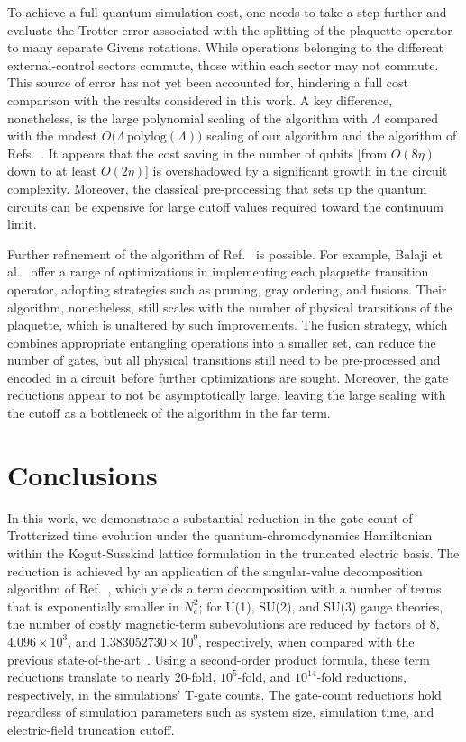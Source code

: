 \documentclass[aps,prd,twocolumn,showpacs,groupedaddress,superscriptaddress,nofootinbib,floatfix,preprintnumbers,longbibliography]{revtex4-1}
\begin{document}
To achieve a full quantum-simulation cost, one needs to take a step further and evaluate the Trotter error associated with the splitting of the plaquette operator to many separate Givens rotations. 
While operations belonging to the different external-control sectors commute, those within each sector may not commute. This source of error has not yet been accounted for, hindering a full cost comparison with the results considered in this work. A key difference, nonetheless, is the large polynomial scaling of the algorithm with $\Lambda$ compared with the modest ${O}\big(\Lambda\,\text{polylog}(\Lambda)\big)$ scaling of our algorithm and the algorithm of Refs.~\cite{Kan:2021xfc,Rhodes:2024zbr}. It appears that the cost saving in the number of qubits [from $O(8\eta)$ down to at least $O(2\eta)$] is overshadowed by a significant growth in the circuit complexity. Moreover, the classical pre-processing that sets up the quantum circuits can be expensive for large cutoff values required toward the continuum limit.

Further refinement of the algorithm of Ref.~\cite{Ciavarella:2021nmj} is possible. For example, Balaji et al.~\cite{Balaji:2025afl} offer a range of optimizations in implementing each plaquette transition operator, adopting strategies such as pruning, gray ordering, and fusions. Their algorithm, nonetheless, still scales with the number of physical transitions of the plaquette, which is unaltered by such improvements. The fusion strategy, which combines appropriate entangling operations into a smaller set, can reduce the number of gates, but all physical transitions still need to be pre-processed and encoded in a circuit before further optimizations are sought. Moreover, the gate reductions appear to not be asymptotically large, leaving the large scaling with the cutoff as a bottleneck of the algorithm in the far term.



\section{Conclusions
\label{sec:outlook}
}
\noindent
In this work, we demonstrate a substantial reduction in the gate count of Trotterized time evolution under the quantum-chromodynamics Hamiltonian within the Kogut-Susskind lattice formulation in the truncated electric basis. The reduction is achieved by an application of the singular-value decomposition algorithm of Ref.~\cite{Davoudi:2022xmb}, which yields a term decomposition with a number of terms that is exponentially smaller in $N_c^2$;
for U(1), SU(2), and SU(3) gauge theories, the number of costly magnetic-term subevolutions are reduced by factors of $8$, $4.096 \times 10^3$, and $1.383052730 \times 10^9$, respectively, when compared with the previous state-of-the-art~\cite{Kan:2021xfc}. Using a second-order product formula, these term reductions translate to nearly $20$-fold, $10^5$-fold, and $10^{14}$-fold reductions, respectively, in the simulations' T-gate counts. The gate-count reductions hold regardless of simulation parameters such as system size, simulation time, and electric-field truncation cutoff. 
\end{document}
